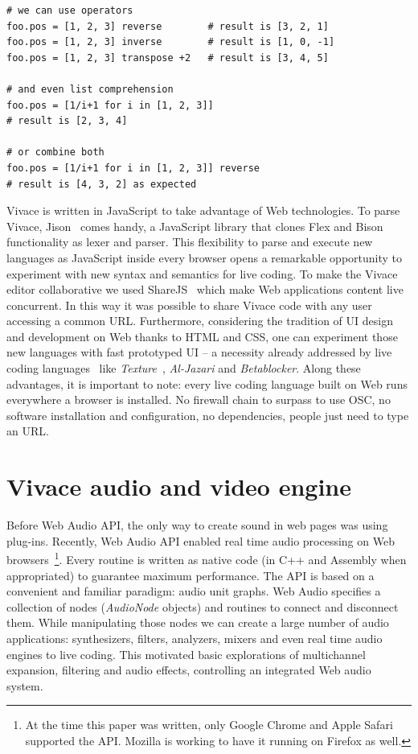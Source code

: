 \documentclass[letterpaper, 12pt]{article}
\begin{document}
\begin{Verbatim}[fontfamily=courier, xleftmargin=\parindent]
# we can use operators
foo.pos = [1, 2, 3] reverse        # result is [3, 2, 1]
foo.pos = [1, 2, 3] inverse        # result is [1, 0, -1]
foo.pos = [1, 2, 3] transpose +2   # result is [3, 4, 5]

# and even list comprehension
foo.pos = [1/i+1 for i in [1, 2, 3]] 
# result is [2, 3, 4]

# or combine both
foo.pos = [1/i+1 for i in [1, 2, 3]] reverse 
# result is [4, 3, 2] as expected
\end{Verbatim}

Vivace is written in JavaScript to take advantage of Web technologies.
To parse Vivace, Jison~\citep{jison} comes handy, a JavaScript
library that clones Flex and Bison functionality as lexer and
parser. This flexibility to parse and execute new languages as
JavaScript inside every browser opens a remarkable opportunity to
experiment with new syntax and semantics for live coding. To make the
Vivace editor collaborative we used ShareJS~\citep{sharejs} which
make Web applications content live concurrent. In this way it was
possible to share Vivace code with any user accessing a common
URL. Furthermore, considering the tradition of UI design and
development on Web thanks to HTML and CSS, one can experiment those
new languages with fast prototyped UI -- a necessity already addressed
by live coding languages~\citep{mclean2010visualisation,
  magnusson2011algorithms} like
\emph{Texture}~\citep{mclean2011texture}, \emph{Al-Jazari} and
\emph{Betablocker}. Along these advantages, it is important to note:
every live coding language built on Web runs everywhere a browser is
installed. No firewall chain to surpass to use OSC, no software
installation and configuration, no dependencies, people just need to
type an URL.

\section{Vivace audio and video engine}

Before Web Audio API, the only way to create sound in web pages was
using plug-ins. Recently, Web Audio API enabled real time audio
processing on Web browsers~\footnote{At the time this paper was
  written, only Google Chrome and Apple Safari supported the
  API. Mozilla is working to have it running on Firefox as
  well.}. Every routine is written as native code (in C++ and Assembly
when appropriated) to guarantee maximum performance. The API is based
on a convenient and familiar paradigm: audio unit graphs. Web Audio
specifies a collection of nodes (\emph{AudioNode} objects) and
routines to connect and disconnect them. While manipulating those
nodes we can create a large number of audio applications:
synthesizers, filters, analyzers, mixers and even real time audio
engines to live coding. This motivated basic explorations of
multichannel expansion, filtering and audio effects, controlling an
integrated Web audio system.
\end{document}
